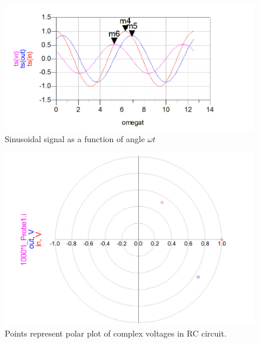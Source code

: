 \documentclass{ximera}
\begin{document}
\begin{example}
\begin{explanation}
\begin{figure}[htbp]
\begin{center}
\includegraphics[scale=0.3]{../jpg/voltagesinRCcircRadADS}
\end{center}
\caption{\label{SSangle} Sinusoidal signal as a function of angle $\omega t$}
\end{figure}


\begin{figure}[htbp]
\begin{center}
\includegraphics[scale=0.2]{../jpg/RCvoltPolarPlotADS.jpg}
\end{center}
\caption{\label{PP} Points represent polar plot of complex voltages in RC circuit.}
\end{figure}



\end{explanation}
\end{example}
\end{document}
